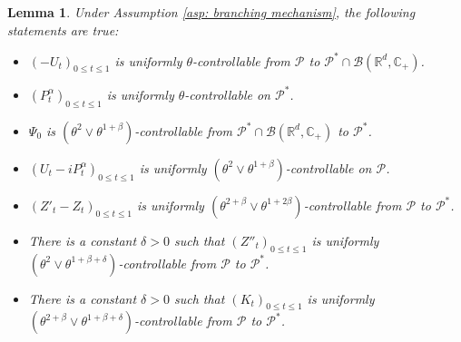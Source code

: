 \documentclass[12pt,a4paper]{amsart}
\theoremstyle{plain}
\newtheorem{lem}[thm]{Lemma}
\theoremstyle{definition}
\numberwithin{equation}{section}
\begin{document}
\begin{lem}
\label{lem: upper bound for usgx}
    Under Assumption \ref{asp: branching mechanism}, the following statements are true:
\begin{itemize}
\item[(1)]
   $(-U_t)_{0\leq t\leq 1}$ is uniformly $\theta$-controllable from $\mathcal P$ to $\mathcal P^*\cap \mathcal B(\mathbb R^d, \mathbb C_+)$.
\item[(2)]
    $(P^\alpha_t)_{0\leq t\leq 1}$ is uniformly $\theta$-controllable on $\mathcal P^*$.
\item[(3)]
    $\Psi_0$ is $(\theta^2\vee \theta^{1+\beta})$-controllable from $\mathcal P^* \cap \mathcal B(\mathbb R^d, \mathbb C_+)$ to $\mathcal P^*$.
\item[(4)]
    $(U_t- iP_t^{\alpha})_{0\leq t\leq 1}$ is uniformly $(\theta^2\vee \theta^{1+\beta})$-controllable on $\mathcal P$.
\item[(5)]
    $(Z'_t-Z_t)_{0\leq t\leq 1}$ is uniformly $(\theta^{2+\beta}\vee \theta^{1+2\beta})$-controllable from $\mathcal P$ to $\mathcal P^*$.
\item[(6)]
    There is a constant $\delta > 0$ such that $(Z''_t)_{0\leq t\leq 1}$ is uniformly $(\theta^2\vee \theta^{1+\beta+\delta})$-controllable from $\mathcal P$ to $\mathcal P^*$.
\item[(7)]
    There is a constant $\delta > 0$ such that $(K_t)_{0\leq t\leq 1}$ is uniformly $(\theta^{2+\beta}\vee \theta^{1+\beta+\delta})$-controllable from $\mathcal P$ to $\mathcal P^*$.
\end{itemize}
\end{lem}
\end{document}
